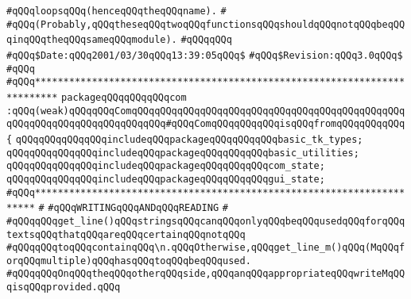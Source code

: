 \verb|#qQQqloopsqQQq(henceqQQqtheqQQqname).|\newline
\verb|#|\newline
\verb|#qQQq(Probably,qQQqtheseqQQqtwoqQQqfunctionsqQQqshouldqQQqnotqQQqbeqQQqinqQQqtheqQQqsameqQQqmodule).|\newline
\verb|#qQQqqQQq|\newline
\verb|#qQQq$Date:qQQq2001/03/30qQQq13:39:05qQQq$|\newline
\verb|#qQQq$Revision:qQQq3.0qQQq$|\newline
\verb|#qQQq|\newline
\verb|#qQQq**************************************************************************|\newline
\newline
\newline
\newline
\verb|packageqQQqqQQqqQQqcom|\newline
\verb|:qQQq(weak)qQQqqQQqComqQQqqQQqqQQqqQQqqQQqqQQqqQQqqQQqqQQqqQQqqQQqqQQqqQQqqQQqqQQqqQQqqQQqqQQqqQQq#qQQqComqQQqqQQqqQQqisqQQqfromqQQqqQQqqQQq|\newline
\verb|{|\newline
\verb|qQQqqQQqqQQqqQQqincludeqQQqpackageqQQqqQQqqQQqbasic_tk_types;|\newline
\verb|qQQqqQQqqQQqqQQqincludeqQQqpackageqQQqqQQqqQQqbasic_utilities;|\newline
\verb|qQQqqQQqqQQqqQQqincludeqQQqpackageqQQqqQQqqQQqcom_state;|\newline
\verb|qQQqqQQqqQQqqQQqincludeqQQqpackageqQQqqQQqqQQqgui_state;|\newline
\newline
\verb|#qQQq**********************************************************************|\newline
\verb|#|\newline
\verb|#qQQqWRITINGqQQqANDqQQqREADING|\newline
\verb|#|\newline
\newline
\newline
\verb|#qQQqqQQqget_line()qQQqstringsqQQqcanqQQqonlyqQQqbeqQQqusedqQQqforqQQqtextsqQQqthatqQQqareqQQqcertainqQQqnotqQQq|\newline
\verb|#qQQqqQQqtoqQQqcontainqQQq\n.qQQqOtherwise,qQQqget_line_m()qQQq(MqQQqforqQQqmultiple)qQQqhasqQQqtoqQQqbeqQQqused.|\newline
\verb|#qQQqqQQqOnqQQqtheqQQqotherqQQqside,qQQqanqQQqappropriateqQQqwriteMqQQqisqQQqprovided.qQQq|\newline
